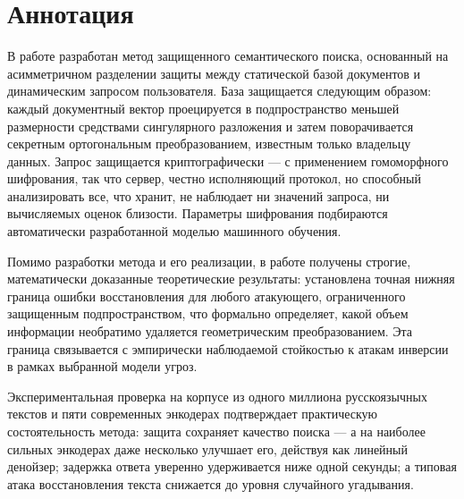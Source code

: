 \documentclass[a4paper, 12pt, oneside, openany]{article}
\newcounter{chap}
\newcommand{\chapsection}[1]{%
  \refstepcounter{chap}%
  \setcounter{equation}{0}%
  \setcounter{table}{0}%
  \setcounter{figure}{0}%
  \section{#1}%
}
\begin{document}
\newpage
\setcounter{page}{2}
\section*{Аннотация}




В работе разработан метод защищенного семантического поиска, основанный на асимметричном разделении защиты между статической базой документов и динамическим запросом пользователя. База защищается следующим образом: каждый документный вектор проецируется в подпространство меньшей размерности средствами сингулярного разложения и затем поворачивается секретным ортогональным преобразованием, известным только владельцу данных. Запрос защищается криптографически — с применением гомоморфного шифрования, так что сервер, честно исполняющий протокол, но способный анализировать все, что хранит, не наблюдает ни значений запроса, ни вычисляемых оценок близости. Параметры шифрования подбираются автоматически разработанной моделью машинного обучения.

Помимо разработки метода и его реализации, в работе получены строгие, математически доказанные теоретические результаты: установлена точная нижняя граница ошибки восстановления для любого атакующего, ограниченного защищенным подпространством, что формально определяет, какой объем информации необратимо удаляется геометрическим преобразованием. Эта граница связывается с эмпирически наблюдаемой стойкостью к атакам инверсии в рамках выбранной модели угроз.

Экспериментальная проверка на корпусе из одного миллиона русскоязычных текстов и пяти современных энкодерах подтверждает практическую состоятельность метода: защита сохраняет качество поиска — а на наиболее сильных энкодерах даже несколько улучшает его, действуя как линейный денойзер; задержка ответа уверенно удерживается ниже одной секунды; а типовая атака восстановления текста снижается до уровня случайного угадывания.


\newpage
\setcounter{tocdepth}{2}  %
\tableofcontents  %
\suppressfloats
\newpage
\end{document}
